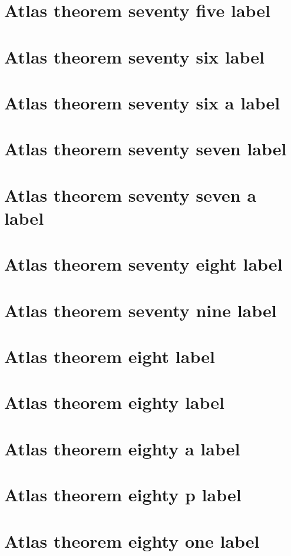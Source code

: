 \documentclass[11pt]{article}
\theoremstyle{definition}
\begin{document}
\section{Atlas theorem seventy five label}
\label{ll:labels:atlas-t75}
\section{Atlas theorem seventy six label}
\label{ll:labels:atlas-t76}
\section{Atlas theorem seventy six a label}
\label{ll:labels:atlas-t76a}
\section{Atlas theorem seventy seven label}
\label{ll:labels:atlas-t77}
\section{Atlas theorem seventy seven a label}
\label{ll:labels:atlas-t77a}
\section{Atlas theorem seventy eight label}
\label{ll:labels:atlas-t78}
\section{Atlas theorem seventy nine label}
\label{ll:labels:atlas-t79}
\section{Atlas theorem eight label}
\label{ll:labels:atlas-t8}
\section{Atlas theorem eighty label}
\label{ll:labels:atlas-t80}
\section{Atlas theorem eighty a label}
\label{ll:labels:atlas-t80a}
\section{Atlas theorem eighty p label}
\label{ll:labels:atlas-t80p}
\section{Atlas theorem eighty one label}
\label{ll:labels:atlas-t81}
\end{document}
